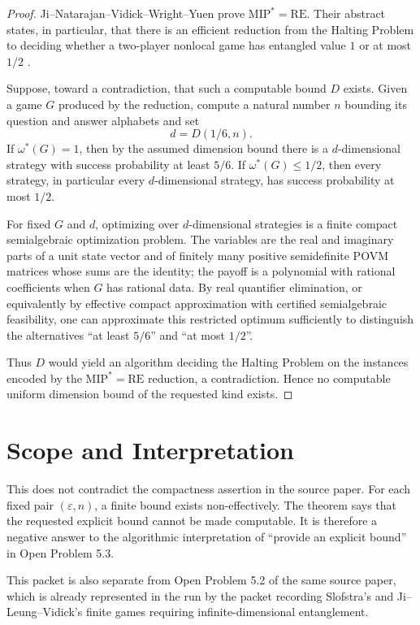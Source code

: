 \documentclass[11pt]{article}
\begin{document}
\begin{proof}
Ji--Natarajan--Vidick--Wright--Yuen prove
\(\mathrm{MIP}^{*}=\mathrm{RE}\).  Their abstract states, in particular, that
there is an efficient reduction from the Halting Problem to deciding whether a
two-player nonlocal game has entangled value \(1\) or at most \(1/2\)
\cite{MIPRE}.

Suppose, toward a contradiction, that such a computable bound \(D\) exists.
Given a game \(G\) produced by the reduction, compute a natural number \(n\)
bounding its question and answer alphabets and set
\[
  d = D(1/6,n).
\]
If \(\omega^*(G)=1\), then by the assumed dimension bound there is a
\(d\)-dimensional strategy with success probability at least \(5/6\).  If
\(\omega^*(G)\le 1/2\), then every strategy, in particular every
\(d\)-dimensional strategy, has success probability at most \(1/2\).

For fixed \(G\) and \(d\), optimizing over \(d\)-dimensional strategies is a
finite compact semialgebraic optimization problem.  The variables are the real
and imaginary parts of a unit state vector and of finitely many positive
semidefinite POVM matrices whose sums are the identity; the payoff is a
polynomial with rational coefficients when \(G\) has rational data.  By real
quantifier elimination, or equivalently by effective compact approximation
with certified semialgebraic feasibility, one can approximate this restricted
optimum sufficiently to distinguish the alternatives ``at least \(5/6\)''
and ``at most \(1/2\)''.

Thus \(D\) would yield an algorithm deciding the Halting Problem on the
instances encoded by the \(\mathrm{MIP}^{*}=\mathrm{RE}\) reduction, a
contradiction.  Hence no computable uniform dimension bound of the requested
kind exists.
\end{proof}

\section*{Scope and Interpretation}

This does not contradict the compactness assertion in the source paper.  For
each fixed pair \((\varepsilon,n)\), a finite bound exists non-effectively.
The theorem says that the requested explicit bound cannot be made computable.
It is therefore a negative answer to the algorithmic interpretation of
``provide an explicit bound'' in Open Problem 5.3.

This packet is also separate from Open Problem 5.2 of the same source paper,
which is already represented in the run by the packet recording Slofstra's and
Ji--Leung--Vidick's finite games requiring infinite-dimensional entanglement.
\end{document}
